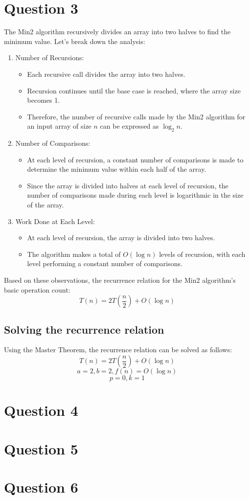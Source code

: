 \documentclass{article}
\begin{document}
\section*{Question 3}
The Min2 algorithm recursively divides an array into two halves to find the minimum value. Let's break down the analysis:
\begin{enumerate}
    \item Number of Recursions:
    \begin{itemize}
    \item Each recursive call divides the array into two halves.
    \item Recursion continues until the base case is reached, where the array size becomes 1.
    \item Therefore, the number of recursive calls made by the Min2 algorithm for an input array of size \( n \) can be expressed as \( \log_2{n} \).
    \end{itemize}

    \item Number of Comparisons:
    \begin{itemize}
    \item At each level of recursion, a constant number of comparisons is made to determine the minimum value within each half of the array.
    \item Since the array is divided into halves at each level of recursion, the number of comparisons made during each level is logarithmic in the size of the array.
    \end{itemize}
    \item Work Done at Each Level:
    \begin{itemize}
    \item At each level of recursion, the array is divided into two halves.
    \item The algorithm makes a total of \( O(\log n) \) levels of recursion, with each level performing a constant number of comparisons.
    \end{itemize}
\end{enumerate}

Based on these observations, the recurrence relation for the Min2 algorithm's basic operation count:
\[ T(n) = 2T\left(\frac{n}{2}\right) + O(\log n) \]

\subsection*{Solving the recurrence relation}
Using the Master Theorem, the recurrence relation can be solved as follows:
\[ T(n) = 2T\left(\frac{n}{2}\right) + O(\log n) \]
\[ a = 2, b = 2, f(n) = O(\log n) \]
\[p = 0, k = 1\]
\newpage
\section*{Question 4}
\newpage
\section*{Question 5}
\newpage
\section*{Question 6}
\newpage
\end{document}
